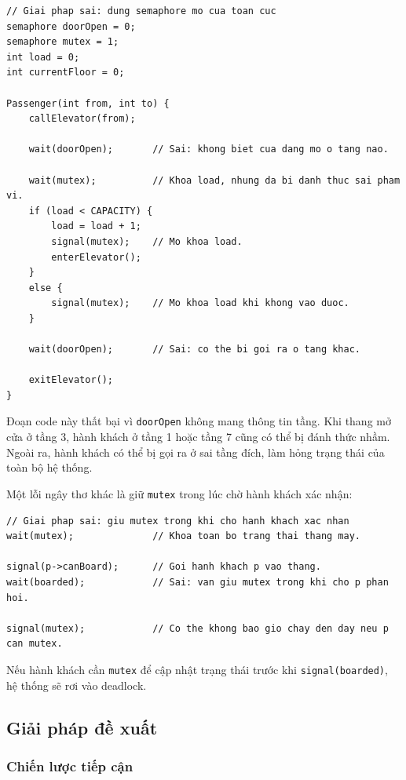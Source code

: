 \begin{lstlisting}
// Giai phap sai: dung semaphore mo cua toan cuc
semaphore doorOpen = 0;
semaphore mutex = 1;
int load = 0;
int currentFloor = 0;

Passenger(int from, int to) {
    callElevator(from);

    wait(doorOpen);       // Sai: khong biet cua dang mo o tang nao.

    wait(mutex);          // Khoa load, nhung da bi danh thuc sai pham vi.
    if (load < CAPACITY) {
        load = load + 1;
        signal(mutex);    // Mo khoa load.
        enterElevator();
    }
    else {
        signal(mutex);    // Mo khoa load khi khong vao duoc.
    }

    wait(doorOpen);       // Sai: co the bi goi ra o tang khac.

    exitElevator();
}
\end{lstlisting}

Đoạn code này thất bại vì \texttt{doorOpen} không mang thông tin tầng.
Khi thang mở cửa ở tầng 3, hành khách ở tầng 1 hoặc tầng 7 cũng có thể
bị đánh thức nhầm. Ngoài ra, hành khách có thể bị gọi ra ở sai tầng đích,
làm hỏng trạng thái của toàn bộ hệ thống.

Một lỗi ngây thơ khác là giữ \texttt{mutex} trong lúc chờ hành khách xác
nhận:

\begin{lstlisting}
// Giai phap sai: giu mutex trong khi cho hanh khach xac nhan
wait(mutex);              // Khoa toan bo trang thai thang may.

signal(p->canBoard);      // Goi hanh khach p vao thang.
wait(boarded);            // Sai: van giu mutex trong khi cho p phan hoi.

signal(mutex);            // Co the khong bao gio chay den day neu p can mutex.
\end{lstlisting}

Nếu hành khách cần \texttt{mutex} để cập nhật trạng thái trước khi
\texttt{signal(boarded)}, hệ thống sẽ rơi vào deadlock.

\subsection{Giải pháp đề xuất}

\subsubsection*{Chiến lược tiếp cận}


